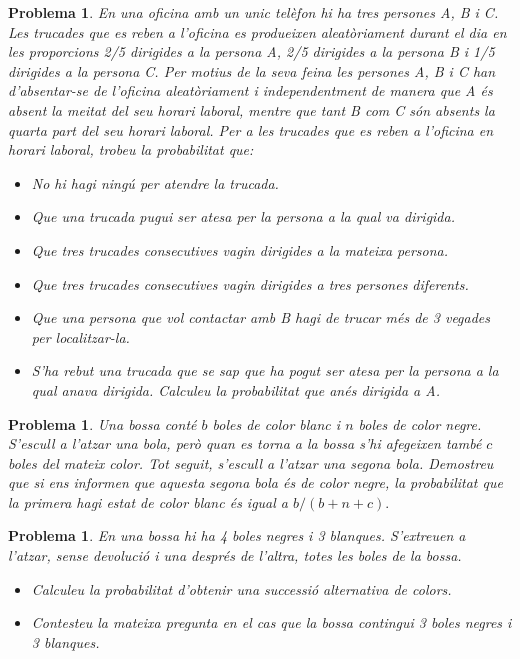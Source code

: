 \documentclass[11pt]{article}
\newcounter{prbcont}
\newtheorem{problema}[prbcont]{Problema}
\begin{document}
\begin{problema}
En una oficina amb un unic tel\`efon hi ha tres persones A, B i C. Les trucades que es reben a l'oficina es produeixen aleat\`oriament durant el dia en les proporcions 2/5 dirigides a la persona A, 2/5 dirigides a la persona B i 1/5 dirigides a la persona C. Per motius de la seva feina les persones A, B i C han d'absentar-se de l'oficina
aleat\`oriament i independentment de manera que A \'es absent la meitat del seu horari laboral, mentre que tant B com C s\'on absents la quarta part del seu horari laboral. Per a les trucades que es reben a l'oficina en horari laboral, trobeu la probabilitat que:
\begin{itemize}
\item [(a)] No hi hagi ning\'u per atendre la trucada. %
\item [(b)] Que una trucada pugui ser atesa per la persona a la qual va dirigida. %
\item [(c)] Que tres trucades consecutives vagin dirigides a la mateixa persona. %
\item [(d)] Que tres trucades consecutives vagin dirigides a tres persones diferents. %
\item [(e)] Que una persona que vol contactar amb B hagi de trucar m\'es de 3 vegades per localitzar-la. %
\item [(f)] S'ha rebut una trucada que se sap que ha pogut ser atesa per la persona a la qual anava dirigida. Calculeu la probabilitat que an\'es dirigida a A. %
\end{itemize}
\end{problema}
              
\begin{problema}
Una bossa cont\'e $b$ boles de color blanc i $n$ boles de color negre. S'escull a l'atzar una bola, per\`o quan es torna a la bossa s'hi afegeixen tamb\'e $c$ boles del mateix color. Tot seguit, s'escull a l'atzar una segona bola. Demostreu que si ens informen que aquesta segona bola \'es de color negre, la probabilitat que la primera hagi estat de color blanc \'es igual a $b/(b+n+c).$
\end{problema}

\begin{problema}
En una bossa hi ha 4 boles negres i 3 blanques. S'extreuen a l'atzar, sense devoluci\'o i una despr\'es de l'altra, totes les boles de la bossa. 
\begin{itemize}
\item [(a)] Calculeu la probabilitat d'obtenir una successi\'o alternativa de colors. %
\item [(b)] Contesteu la mateixa pregunta en el cas que la bossa contingui 3 boles negres i 3 blanques. %
\end{itemize}
\end{problema}
\end{document}
